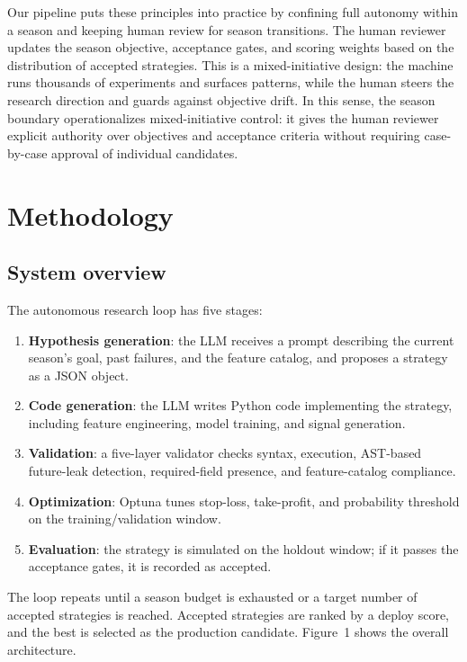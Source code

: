 \documentclass[11pt,a4paper]{article}
\begin{document}
Our pipeline puts these principles into practice by confining full autonomy within a season and keeping human review for season transitions. The human reviewer updates the season objective, acceptance gates, and scoring weights based on the distribution of accepted strategies. This is a mixed-initiative design: the machine runs thousands of experiments and surfaces patterns, while the human steers the research direction and guards against objective drift. In this sense, the season boundary operationalizes mixed-initiative control: it gives the human reviewer explicit authority over objectives and acceptance criteria without requiring case-by-case approval of individual candidates.

\section{Methodology}\label{methodology}


\subsection{System overview}\label{system-overview}

The autonomous research loop has five stages:

\begin{enumerate}
\def\labelenumi{\arabic{enumi}.}
\item
  \textbf{Hypothesis generation}: the LLM receives a prompt describing the current season's goal, past failures, and the feature catalog, and proposes a strategy as a JSON object.
\item
  \textbf{Code generation}: the LLM writes Python code implementing the strategy, including feature engineering, model training, and signal generation.
\item
  \textbf{Validation}: a five-layer validator checks syntax, execution, AST-based future-leak detection, required-field presence, and feature-catalog compliance.
\item
  \textbf{Optimization}: Optuna tunes stop-loss, take-profit, and probability threshold on the training/validation window.
\item
  \textbf{Evaluation}: the strategy is simulated on the holdout window; if it passes the acceptance gates, it is recorded as accepted.
\end{enumerate}

The loop repeats until a season budget is exhausted or a target number of accepted strategies is reached. Accepted strategies are ranked by a deploy score, and the best is selected as the production candidate. Figure~1 shows the overall architecture.
\end{document}

